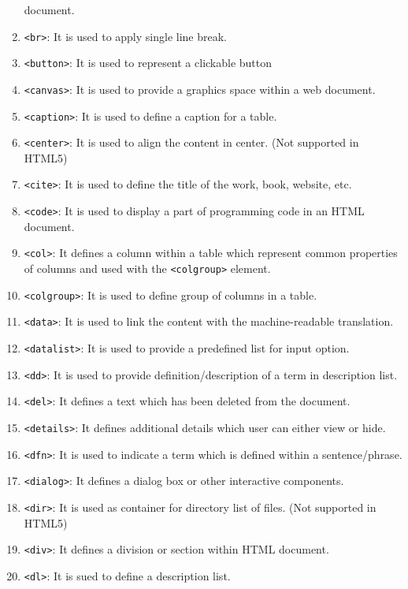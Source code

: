 \documentclass[a4paper]{article}
\begin{document}
\begin{enumerate}
      document.
    \item \texttt{<br>}: It is used to apply single line break.
    \item \texttt{<button>}: It is used to represent a clickable button
    \item \texttt{<canvas>}: It is used to provide a graphics space within a 
      web document.
    \item \texttt{<caption>}: It is used to define a caption for a table.
    \item \texttt{<center>}: It is used to align the content in center.
      (Not supported in HTML5)
    \item \texttt{<cite>}: It is used to define the title of the work, book,
      website, etc.
    \item \texttt{<code>}: It is used to display a part of programming code in
      an HTML document.
    \item \texttt{<col>}: It defines a column within a table which represent 
      common properties of columns and used with the \texttt{<colgroup>}
      element.
    \item \texttt{<colgroup>}: It is used to define group of columns in a 
      table.
    \item \texttt{<data>}: It is used to link the content with the
      machine-readable translation.
    \item \texttt{<datalist>}: It is used to provide a predefined list for 
      input option.
    \item \texttt{<dd>}: It is used to provide definition/description of a 
      term in description list.
    \item \texttt{<del>}: It defines a text which has been deleted from the 
      document.
    \item \texttt{<details>}: It defines additional details which user can
      either view or hide.
    \item \texttt{<dfn>}: It is used to indicate a term which is defined
      within a sentence/phrase.
    \item \texttt{<dialog>}: It defines a dialog box or other interactive
      components.
    \item \texttt{<dir>}: It is used as container for directory list of files.
      (Not supported in HTML5)
    \item \texttt{<div>}: It defines a division or section within HTML 
      document.
    \item \texttt{<dl>}: It is sued to define a description list.

\end{enumerate}
\end{document}
